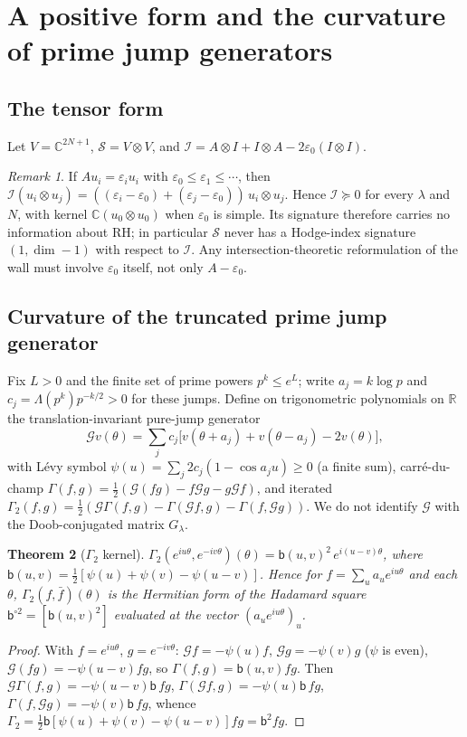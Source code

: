 \documentclass[11pt]{amsart}
\newtheorem{theorem}{Theorem}[section]
\theoremstyle{definition}
\theoremstyle{remark}
\newtheorem{remark}[theorem]{Remark}
\newcommand{\half}{\tfrac{1}{2}}
\newcommand{\Lam}{\Lambda}
\newcommand{\eps}{\varepsilon}
\newcommand{\R}{\mathbb{R}}
\newcommand{\C}{\mathbb{C}}
\newcommand{\bk}{\mathsf{b}}
\begin{document}
\section{A positive form and the curvature of prime jump generators}

\subsection{The tensor form}
Let $V=\C^{2N+1}$, $\mathcal S=V\otimes V$, and
$\mathcal I=A\otimes I+I\otimes A-2\eps_0(I\otimes I)$.

\begin{remark}\label{prop:hodge}
If $A u_i=\eps_iu_i$ with $\eps_0\le\eps_1\le\cdots$, then $\mathcal I(u_i\otimes u_j)=
((\eps_i-\eps_0)+(\eps_j-\eps_0))\,u_i\otimes u_j$. Hence $\mathcal I\succeq0$ for every $\lambda$
and $N$, with kernel $\C(u_0\otimes u_0)$ when $\eps_0$ is simple. Its signature therefore carries
no information about RH; in particular $\mathcal S$ never has a Hodge-index signature
$(1,\dim-1)$ with respect to $\mathcal I$. Any intersection-theoretic reformulation of the wall
must involve $\eps_0$ itself, not only $A-\eps_0$.
\end{remark}

\subsection{Curvature of the truncated prime jump generator}
Fix $L>0$ and the finite set of prime powers $p^k\le e^L$; write $a_j=k\log p$ and
$c_j=\Lam(p^k)p^{-k/2}>0$ for these jumps. Define on trigonometric polynomials on $\R$ the
translation-invariant pure-jump generator
\[
   \mathcal G v(\theta)=\sum_j c_j\big[v(\theta+a_j)+v(\theta-a_j)-2v(\theta)\big],
\]
with L\'evy symbol $\psi(u)=\sum_j 2c_j(1-\cos a_ju)\ge0$ (a finite sum), carr\'e-du-champ
$\Gamma(f,g)=\half(\mathcal G(fg)-f\mathcal Gg-g\mathcal Gf)$, and iterated
$\Gamma_2(f,g)=\half(\mathcal G\Gamma(f,g)-\Gamma(\mathcal Gf,g)-\Gamma(f,\mathcal Gg))$. We do not
identify $\mathcal G$ with the Doob-conjugated matrix $G_\lambda$.

\begin{theorem}[$\Gamma_2$ kernel]\label{thm:gamma2kernel}
$\Gamma_2(e^{iu\theta},e^{-iv\theta})(\theta)=\bk(u,v)^2\,e^{i(u-v)\theta}$, where
$\bk(u,v)=\half[\psi(u)+\psi(v)-\psi(u-v)]$. Hence for $f=\sum_u a_u e^{iu\theta}$ and each
$\theta$, $\Gamma_2(f,\bar f)(\theta)$ is the Hermitian form of the Hadamard square
$\bk^{\circ2}=[\bk(u,v)^2]$ evaluated at the vector $(a_ue^{iu\theta})_u$.
\end{theorem}
\begin{proof}
With $f=e^{iu\theta}$, $g=e^{-iv\theta}$: $\mathcal Gf=-\psi(u)f$, $\mathcal Gg=-\psi(v)g$ ($\psi$
is even), $\mathcal G(fg)=-\psi(u-v)fg$, so $\Gamma(f,g)=\bk(u,v)fg$. Then
$\mathcal G\Gamma(f,g)=-\psi(u-v)\bk\,fg$, $\Gamma(\mathcal Gf,g)=-\psi(u)\bk\,fg$,
$\Gamma(f,\mathcal Gg)=-\psi(v)\bk\,fg$, whence $\Gamma_2=\half\bk[\psi(u)+\psi(v)-\psi(u-v)]fg
=\bk^2fg$.
\end{proof}
\end{document}
